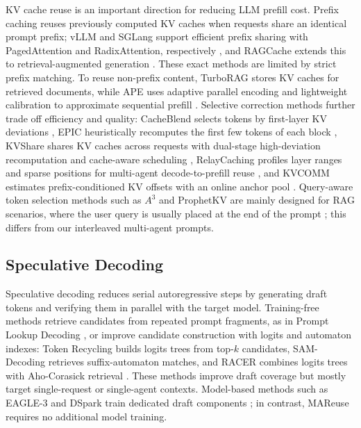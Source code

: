\documentclass[letterpaper]{article} %
\begin{document}
KV cache reuse is an important direction for reducing LLM prefill cost. Prefix caching reuses previously computed KV caches when requests share an identical prompt prefix; vLLM and SGLang support efficient prefix sharing with PagedAttention and RadixAttention, respectively \citep{DBLP:conf/sosp/KwonLZ0ZY0ZS23, DBLP:conf/nips/ZhengYXS0YCKSGB24}, and RAGCache extends this to retrieval-augmented generation \citep{DBLP:journals/tocs/JinZJLLLJ26}. These exact methods are limited by strict prefix matching. To reuse non-prefix content, TurboRAG stores KV caches for retrieved documents, while APE uses adaptive parallel encoding and lightweight calibration to approximate sequential prefill \citep{DBLP:conf/emnlp/LuWRCT25, DBLP:conf/iclr/0002CC25}. Selective correction methods further trade off efficiency and quality: CacheBlend selects tokens by first-layer KV deviations \citep{DBLP:conf/eurosys/YaoLLRCZD0J25}, EPIC heuristically recomputes the first few tokens of each block \citep{DBLP:conf/icml/HuHWWHZFCS025}, KVShare shares KV caches across requests with dual-stage high-deviation recomputation and cache-aware scheduling \citep{DBLP:journals/corr/abs-2503-16525}, RelayCaching profiles layer ranges and sparse positions for multi-agent decode-to-prefill reuse \citep{DBLP:journals/corr/abs-2603-13289}, and KVCOMM estimates prefix-conditioned KV offsets with an online anchor pool \citep{DBLP:journals/corr/abs-2510-12872}. Query-aware token selection methods such as $A^3$ and ProphetKV are mainly designed for RAG scenarios, where the user query is usually placed at the end of the prompt \citep{DBLP:journals/corr/abs-2511-17560, DBLP:journals/corr/abs-2602-02579}; this differs from our interleaved multi-agent prompts.

\subsection{Speculative Decoding}

Speculative decoding reduces serial autoregressive steps by generating draft tokens and verifying them in parallel with the target model. Training-free methods retrieve candidates from repeated prompt fragments, as in Prompt Lookup Decoding \citep{saxena2023promptlookup}, or improve candidate construction with logits and automaton indexes: Token Recycling builds logits trees from top-$k$ candidates, SAM-Decoding retrieves suffix-automaton matches, and RACER combines logits trees with Aho-Corasick retrieval \citep{DBLP:conf/acl/LuoWZZZ0X25, DBLP:conf/acl/HuWZZLCZ25, DBLP:conf/acl/ZhangLZWZ26}. These methods improve draft coverage but mostly target single-request or single-agent contexts. Model-based methods such as EAGLE-3 and DSpark train dedicated draft components \citep{DBLP:conf/nips/LiWZZ25, cheng2026dspark}; in contrast, MAReuse requires no additional model training.
\end{document}

